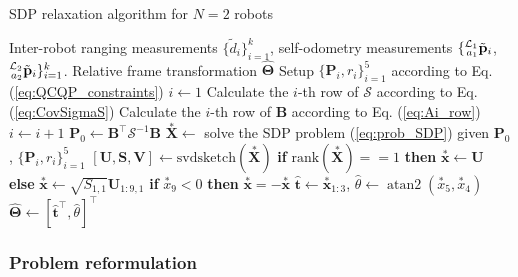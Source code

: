 \documentclass[journal]{IEEEtran}
\def\CovMatS{\mathcal{S}}
\def\StateVector{\mathbf{\Theta}}
\DeclareMathOperator{\atantwo}{atan2}
\begin{document}
\begin{algorithm}
\color{black}
\caption{\color{black}SDP relaxation algorithm for $N=2$ robots}\label{alg:sdp}
\begin{algorithmic}
    \Require Inter-robot ranging measurements $\{\tilde{d}_i\}_{i=1}^k$, self-odometry measurements $\{\prescript{\mathcal{L}_1}{a_1}{\tilde{\mathbf{{p}}}_i}$, $\prescript{\mathcal{L}_2}{a_2}{\tilde{\mathbf{{p}}}_i}\}_{i=1}^k$.
    \Ensure Relative frame transformation $\hat{\StateVector}$
    \State Setup $\{\mathbf{P}_i, r_i\}_{i=1}^5$ according to Eq. (\ref{eq:QCQP_constraints})
    \State $i \gets 1$
        \State Calculate the $i$-th row of $\CovMatS$ according to Eq. (\ref{eq:CovSigmaS})
        \State Calculate the $i$-th row of $\mathbf{B}$ according to Eq. (\ref{eq:Ai_row})
        \State $i \gets i + 1$
    \EndWhile
    \State $\mathbf{P}_0 \gets \mathbf{B}^\top \CovMatS^{-1} \mathbf{B}$
    \State $\overset{*}{\mathbf{X}} \gets$ solve the SDP problem (\ref{eq:prob_SDP}) given $\mathbf{P}_0$, $\{\mathbf{P}_i, r_i\}_{i=1}^5$
    \State $[\mathbf{U}, \mathbf{S}, \mathbf{V}] \gets \textrm{svdsketch}(\overset{*}{\mathbf{X}})$
    \State \textbf{if} $\textrm{rank}(\overset{*}{\mathbf{X}}) == 1$ \textbf{then} $\overset{*}{\mathbf{x}} \gets \mathbf{U}$ \textbf{else} $\overset{*}{\mathbf{x}} \gets \sqrt{S_{1,1}} \mathbf{U}_{1:9,1}$
    \State \textbf{if} $\overset{*}{x}_9 < 0$ \textbf{then} $\overset{*}{\mathbf{x}} = -\overset{*}{\mathbf{x}}$
    \State $\hat{\mathbf{t}} \gets \overset{*}{\mathbf{x}}_{1:3}$, $\hat{\theta} \gets \atantwo(\overset{*}{x}_5, \overset{*}{x}_4)$
    \State $\hat{\StateVector} \gets [\hat{\mathbf{t}}^\top, \hat{\theta}]^\top$
\end{algorithmic}
\end{algorithm}

\subsubsection{Problem reformulation}
\end{document}
